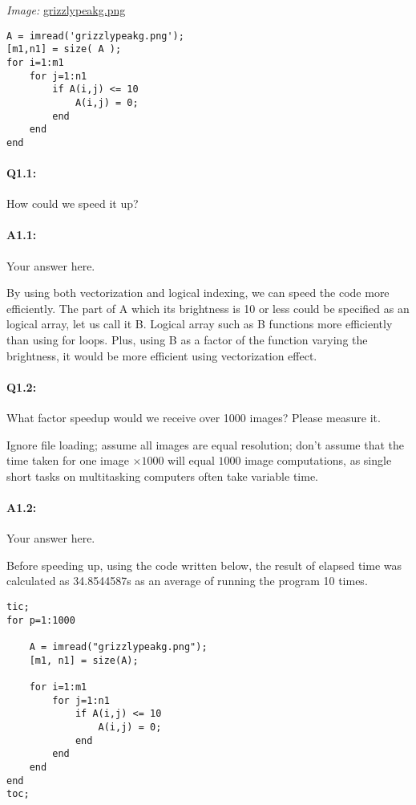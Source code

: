 \documentclass[11pt]{article}
\begin{document}
\emph{Image:} \href{grizzlypeakg.png}{grizzlypeakg.png}

\begin{lstlisting}[style=Matlab-editor]
A = imread('grizzlypeakg.png');
[m1,n1] = size( A );
for i=1:m1
    for j=1:n1
        if A(i,j) <= 10
            A(i,j) = 0;
        end
    end
end
\end{lstlisting}

\paragraph{Q1.1:} How could we speed it up?

\paragraph{A1.1:} Your answer here.

 By using both vectorization and logical indexing, we can speed the code more efficiently. The part of A which its brightness is 10 or less could be specified as an logical array, let us call it B. Logical array such as B functions more efficiently than using for loops. Plus, using B as a factor of the function varying the brightness, it would be more efficient using vectorization effect. 




\pagebreak
\paragraph{Q1.2:} What factor speedup would we receive over 1000 images? Please measure it.

Ignore file loading; assume all images are equal resolution; don't assume that the time taken for one image $\times1000$ will equal $1000$ image computations, as single short tasks on multitasking computers often take variable time.

\paragraph{A1.2:} Your answer here.

Before speeding up, using the code written below, the result of elapsed time was calculated as 34.8544587s as an average of running the program 10 times.

\begin{lstlisting}[style=Matlab-editor]
tic;
for p=1:1000

    A = imread("grizzlypeakg.png");
    [m1, n1] = size(A);

    for i=1:m1
        for j=1:n1
            if A(i,j) <= 10
                A(i,j) = 0;
            end
        end
    end
end
toc;
\end{lstlisting}
\end{document}
